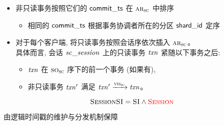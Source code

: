 \begin{frame}{}
  \begin{definition}
	  \begin{itemize}
	    \setlength{\itemsep}{10pt}
	    \item 非只读事务按照它们的 ${\sf commit\_ts}$ 在 $\textsc{ar}_{\textsc{sc}}$ 中排序 \\[5pt]
        \begin{itemize}
          \item 相同的 ${\sf commit\_ts}$ 根据事务协调者所在的分区 ${\sf shard\_id}$ 定序
        \end{itemize}
	    \item 对于每个客户端, 将只读事务按照会话序依次插入 $\textsc{ar}_{\textsc{sc}}$。\\[5pt]
	      具体而言, 会话 $\mathit{sc\_session}$ 上的只读事务 $\mathit{txn}$ 紧随以下事务之后: \\[5pt]
	      \begin{itemize}
	  	    \setlength{\itemsep}{5pt}
          \item $\mathit{txn}$ 在 $\textsc{so}_{\textsc{sc}}$ 序下的前一个事务 (如果有),
          \item 非只读事务 $\mathit{txn}'$ 满足 $\mathit{txn}' \xrightarrow{\textsc{vis}_{\textsc{sc}}} \mathit{txn}$。
        \end{itemize}
    \end{itemize}
  \end{definition}
\end{frame}

\begin{frame}{}

  \[
  	\textsc{SessionSI} = \textsc{SI} \land \textcolor{red}{\textsc{Session}}
  \]

  \begin{center}
    由逻辑时间戳的维护与分发机制保障
  \end{center}
\end{frame}
